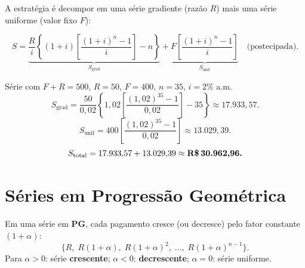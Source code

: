 A estratégia é decompor em uma série gradiente (razão $R$) mais uma série uniforme (valor fixo $F$):
\begin{resultado}
\[
  S = \underbrace{\frac{R}{i}\left\{(1+i)\left[\frac{(1+i)^n-1}{i}\right]-n\right\}}_{S_{\text{grad}}}
    + \underbrace{F\left[\frac{(1+i)^n-1}{i}\right]}_{S_{\text{unif}}}
    \quad\text{(postecipada)}.
\]
\end{resultado}

\begin{exemplo}{Série com $F{+}R = 500$, $R = 50$, $F = 400$, $n = 35$, $i = 2\%$ a.m.}
\[
  S_{\text{grad}}
    = \frac{50}{0{,}02}\left\{1{,}02\left[\frac{(1{,}02)^{35}-1}{0{,}02}\right]-35\right\}
    \approx 17{.}933{,}57.
\]
\[
  S_{\text{unif}} = 400\left[\frac{(1{,}02)^{35}-1}{0{,}02}\right]
                 \approx 13{.}029{,}39.
\]
\[
  S_{\text{total}} = 17{.}933{,}57 + 13{.}029{,}39 \approx \textbf{R\$\,30.962{,}96.}
\]
\end{exemplo}

\section{Séries em Progressão Geométrica}

\begin{definicao}
Em uma série em \textbf{PG}, cada pagamento cresce (ou decresce) pelo fator constante $(1+\alpha)$:
\[
  \{R,\; R(1+\alpha),\; R(1+\alpha)^2,\; \ldots,\; R(1+\alpha)^{n-1}\}.
\]
Para $\alpha > 0$: série \textbf{crescente}; $\alpha < 0$: \textbf{decrescente}; $\alpha = 0$: série uniforme.
\end{definicao}

\begin{center}
\end{center}

